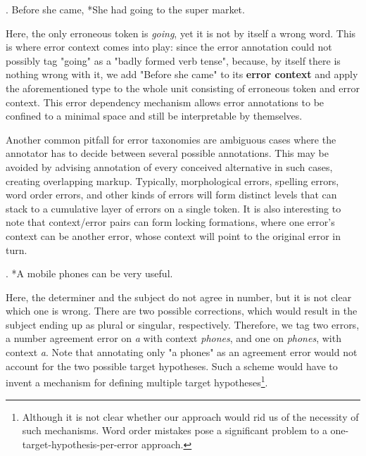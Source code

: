 \documentclass[12pt]{article}
\begin{document}
\ex. Before she came, *She had going to the super market.

Here, the only erroneous token is \textit{going}, yet it is not by itself a
wrong word. This is where error context comes into play: since the error
annotation could not possibly tag "going" as a "badly formed verb tense", because, by
itself there is nothing wrong with it, we add "Before she came" to its
\textbf{error context} and apply the aforementioned type to the whole unit
consisting of erroneous token and error context. This error dependency mechanism
allows error annotations to be confined to a minimal space and still be
interpretable by themselves.

Another common pitfall for error taxonomies are ambiguous cases where the
annotator has to decide between several possible annotations. This may be
avoided by advising annotation of every conceived alternative in such cases,
creating overlapping markup. Typically, morphological errors, spelling errors,
word order errors, and other kinds of errors will form distinct levels that can
stack to a cumulative layer of errors on a single token. It is also interesting
to note that context/error pairs can form locking formations, where one error's
context can be another error, whose context will point to the original error in
turn.

\ex. *A mobile phones can be very useful.

Here, the determiner and the subject do not agree in number, but it is not clear
which one is wrong. There are two possible corrections, which would result
in the subject ending up as plural or singular, respectively. Therefore, we tag
two errors, a number agreement error on \textit{a} with context \textit{phones}, and
one on \textit{phones}, with context \textit{a}. Note that annotating only "a
phones" as an agreement error would not account for the two possible target
hypotheses. Such a scheme would have to invent a mechanism for defining multiple
target hypotheses\footnote{Although it is not clear whether our approach would
rid us of the necessity of such mechanisms. Word order mistakes pose a
significant problem to a one-target-hypothesis-per-error approach.}.

\end{document}
